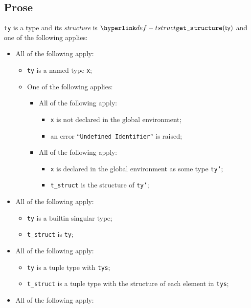 \documentclass{book}
\begin{document}
    \subsection{Prose}
    \texttt{ty} is a type and its \hypertarget{def-tstruct}{\emph{structure}} is $\tstruct(\ty)$ and one of the following
    applies:
    \begin{itemize}
    \item All of the following apply:
      \begin{itemize}
      \item \texttt{ty} is a named type \texttt{x};
      \item One of the following applies:
        \begin{itemize}
        \item All of the following apply:
          \begin{itemize}
          \item \texttt{x} is not declared in the global environment;
          \item an error ``\texttt{Undefined Identifier}'' is raised;
          \end{itemize}
        \item All of the following apply:
          \begin{itemize}
          \item \texttt{x} is declared in the global environment as some type \texttt{ty'};
          \item \texttt{t\_struct} is the structure of \texttt{ty'};
          \end{itemize}
       \end{itemize}
      \end{itemize}
    \item All of the following apply:
      \begin{itemize}
      \item \texttt{ty} is a builtin singular type;
      \item \texttt{t\_struct} is \texttt{ty};
      \end{itemize}
    \item All of the following apply:
      \begin{itemize}
      \item \texttt{ty} is a tuple type with \texttt{tys};
      \item \texttt{t\_struct} is a tuple type with the structure of each element in \texttt{tys};
      \end{itemize}
    \item All of the following apply:

\end{itemize}
\end{document}
